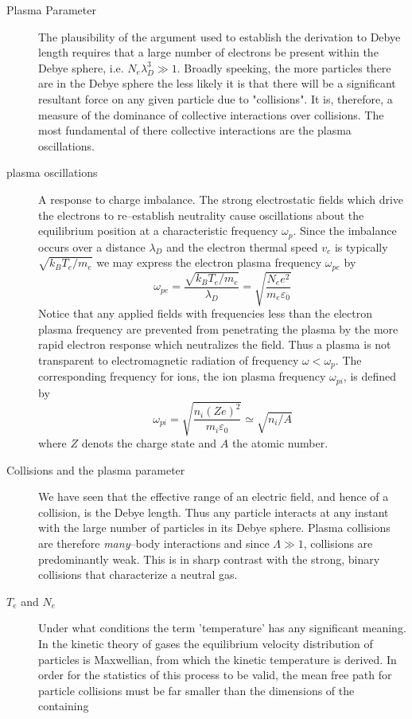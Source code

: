 \documentclass[openany]{book}
\begin{document}
\begin{description}
\item[Plasma Parameter] The plausibility of the argument used to establish the derivation to Debye length requires that a large number of electrons be present within the Debye sphere, i.e. $N_e \lambda_D^3\gg1$. Broadly speeking, the more particles there are in the Debye sphere the less likely it is that there will be a significant resultant force on any given particle due to "collisions". It is, therefore, a measure of the dominance of collective interactions over collisions. The most fundamental of there collective interactions are the plasma oscillations.
\item[plasma oscillations] A response to charge imbalance. The strong electrostatic fields which drive the electrons to re--establish neutrality cause oscillations about the equilibrium position at a characteristic frequency $\omega_p$. Since the imbalance occurs over a distance $\lambda_D$ and the electron thermal speed $v_e$ is typically $\sqrt{k_B T_e/m_e}$ we may express the electron plasma frequency $\omega_{pe}$ by
$$\omega_{pe}=\frac{\sqrt{k_B T_e / m_e}}{\lambda_D}=\sqrt{\frac{N_e e^2}{m_e \varepsilon_0}}$$
Notice that any applied fields with frequencies less than the electron plasma frequency are prevented from penetrating the plasma by the more rapid electron response which neutralizes the field. Thus a plasma is not transparent to electromagnetic radiation of frequency $\omega < \omega_p $. The corresponding frequency for ions, the ion plasma frequency $\omega_{pi}$, is defined by 
$$\omega_{pi}=\sqrt{\frac{n_i (Z e)^2}{m_i \varepsilon_0}}\simeq \sqrt{n_i/A}$$
where $Z$ denots the charge state and $A$ the atomic number.
\item[Collisions and the plasma parameter] We have seen that the effective range of an electric field, and hence of a collision, is the Debye length. Thus any particle interacts at any instant with the large number of particles in its Debye sphere. Plasma collisions are therefore \emph{many}--body interactions and since $\Lambda \gg 1$, collisions are predominantly weak. This is in sharp contrast with the strong, binary collisions that characterize a neutral gas.
\item[$T_e$ and $N_e$]
Under what conditions the term 'temperature' has any significant meaning. In the kinetic theory of gases the equilibrium velocity distribution of particles is Maxwellian, from which the kinetic temperature
is derived.  In order for the statistics of this process to be valid, the mean free path
for particle collisions must be far smaller than the dimensions of the containing

\end{description}
\end{document}
